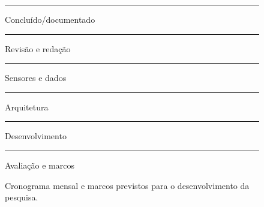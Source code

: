 \begin{landscape}
\begin{figure}[H]
\begin{tikzpicture}[x=0.68cm,y=0.84cm]
\end{tikzpicture}

\vspace{1mm}
\scriptsize
\colorbox{donegray}{\rule{0.35cm}{0.1cm}} Concluído/documentado\quad
\colorbox{reviewblue}{\rule{0.35cm}{0.1cm}} Revisão e redação\quad
\colorbox{sensorsorange}{\rule{0.35cm}{0.1cm}} Sensores e dados\quad
\colorbox{archteal}{\rule{0.35cm}{0.1cm}} Arquitetura\quad
\colorbox{buildgreen}{\rule{0.35cm}{0.1cm}} Desenvolvimento\quad
\colorbox{evalgold}{\rule{0.35cm}{0.1cm}} Avaliação e marcos

\caption{Cronograma mensal e marcos previstos para o desenvolvimento da pesquisa.}
\label{fig:cronograma-pesquisa}
\end{figure}
\end{landscape}
\clearpage
